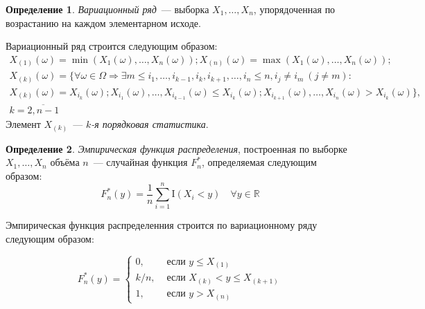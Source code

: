 \documentclass[oneside,final,14pt]{extreport}
\theoremstyle{plain}
\theoremstyle{definition}
\newtheorem*{defn}{Определение}
\theoremstyle{named}
\begin{document}
\begin{defn}
{\it Вариационный ряд}~--- выборка $X_{1}, \ldots, X_{n}$, упорядоченная по возрастанию на каждом элементарном исходе.
\end{defn}
Вариационный ряд строится следующим образом:
\begin{multline*}
    X_{(1)}(\omega)=\min (X_{1}(\omega), \ldots, X_{n}(\omega)); X_{(n)}(\omega)=\max (X_{1}(\omega), \ldots, X_{n}(\omega)); \\
    X_{(k)}(\omega)=\{\forall \omega \in \Omega \Rightarrow \exists m \leqslant i_{1}, \ldots, i_{k-1}, i_{k}, i_{k+1}, \ldots, i_{n} \leqslant n, i_{j} \neq i_{m}~ (j \neq m): \\ 
    X_{(k)}(\omega)=X_{i_{k}}(\omega);
    X_{i_{1}}(\omega), \ldots, X_{i_{k-1}}(\omega) \leqslant X_{i_{k}}(\omega); X_{i_{k+1}}(\omega), \ldots, X_{i_{n}}(\omega)>X_{i_{k}}(\omega)\}, \\
    k = \overline{2, n-1}
\end{multline*}
Элемент $X_{(k)}$~--- {\it $k$-я порядковая статистика}.

\begin{defn}
{\it Эмпирическая функция распределения}, построенная по выборке $X_{1}, \ldots, X_{n}$ объёма $n$~--- случайная функция $F_{n}^{*}$, определяемая следующим образом:
\begin{equation*}
    F_{n}^{*}(y) =\frac{1}{n} \sum\limits_{i=1}^{n} \mathrm{I}\left(X_{i}<y\right) \quad \forall y \in \mathbb{R}
\end{equation*}
\end{defn}

Эмпирическая функция распределенния строится по вариационному ряду следующим образом:

\begin{equation*}
    F_{n}^{*}(y)=\left\{\begin{array}{ll}
    0, & \text { если } y \leqslant X_{(1)} \\
    k/n, & \text { если } X_{(k)}<y \leqslant X_{(k+1)} \\
    1, & \text { если } y>X_{(n)}
    \end{array}\right.
\end{equation*}
\end{document}

